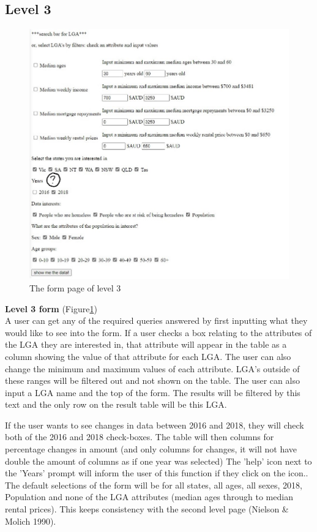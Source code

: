 \documentclass[12pt, a4paper]{article}
\begin{document}
\subsection{Level 3}
\begin{figure}[h]
\centering
\includegraphics[scale=.9]{level3form.jpeg} 
\caption{The form page of level 3}
\label{fig:3form}
\end{figure}
\textbf{Level 3 form} (Figure\ref{fig:3form})\\
A user can get any of the required queries answered by first inputting what they would like to see into the form. If a user checks a box relating to the attributes of the LGA they are interested in, that attribute will appear in the table as a column showing the value of that attribute for each LGA. The user can also change the minimum and maximum values of each attribute. LGA's outside of these ranges will be filtered out and not shown on the table. The user can also input a LGA name and the top of the form. The results will be filtered by this text and the only row on the result table will be this LGA.

If the user wants to see changes in data between 2016 and 2018, they will check both of the 2016 and 2018 check-boxes.  The table will then columns for percentage changes in amount (and only columns for changes, it will not have double the amount of columns as if one year was selected) The 'help' icon next to the 'Years' prompt will inform the user of this function if they click on the icon..
The default selections of the form will be for all states, all ages, all sexes, 2018, Population and none of the LGA attributes (median ages through to median rental prices). This keeps consistency with the second level page (Nielson \& Molich 1990).
 
\end{document}
